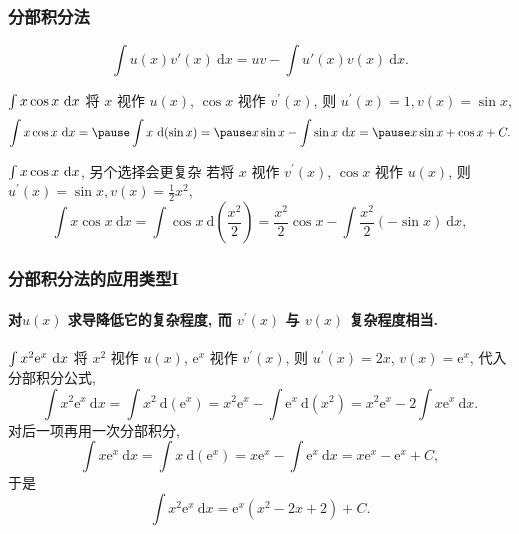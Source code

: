 \documentclass[
10pt,
aspectratio=43,
]{beamer}
\begin{document}
\begin{frame}
	\frametitle{分部积分法}
	\everymath{\displaystyle}
	\begin{block}{}
		$$
			\int u(x)v'(x)\mathrm{~d} x = uv - \int u'(x)v(x)\mathrm{~d} x.
		$$
	\end{block}
	\pause
	{\small
		\begin{exampleblock}{$\color{black}\int x \cos x \mathrm{~d} x$}
			将 $x$ 视作 $u(x)$, $\cos x$ 视作 $v^{\prime}(x)$, 则 $u^{\prime}(x)=1, v(x)=\sin x$,
			$$
				\int x \cos x \mathrm{~d} x  =\pause \int x \mathrm{~d}(\sin x)  =\pause x \sin x-\int \sin x \mathrm{~d} x=\pause x \sin x+\cos x+C.
			$$
		\end{exampleblock}
		\pause
		\begin{alertblock}{$\color{black}\int x \cos x \mathrm{~d} x$, {\color{black}另个选择会更复杂}}
			若将 $x$ 视作 $v^{\prime}(x)$, $\cos x$ 视作 $u(x)$, 则 $u^{\prime}(x)=\sin x, v(x)=\frac{1}{2}x^2$,
			$$
				\int x \cos x \mathrm{~d} x=\int \cos x \mathrm{~d}\left(\frac{x^2}{2}\right)=\frac{x^2}{2} \cos x-\int \frac{x^2}{2}(-\sin x) \mathrm{~d} x,
			$$
		\end{alertblock}
	}
\end{frame}

\begin{frame}
	\frametitle{分部积分法的应用类型I}
	\framesubtitle{对$u(x)$ 求导降低它的复杂程度, 而 $v^{\prime}(x)$ 与 $v(x)$ 复杂程度相当. }
	\everymath{\displaystyle}
	\begin{exampleblock}{$\color{black}\int x^2 \mathrm{e}^x \mathrm{~d} x$}
		\pause 将 $x^2$ 视作 $u(x)$, $\mathrm{e}^x$ 视作 $v^{\prime}(x)$, \pause 则 $u^{\prime}(x)=2 x$, $v(x)=\mathrm{e}^x$, 代入分部积分公式,
		$$
			\int x^2 \mathrm{e}^x \mathrm{~d} x=\int x^2 \mathrm{~d}\left(\mathrm{e}^x\right)=x^2 \mathrm{e}^x-\int \mathrm{e}^x \mathrm{~d}\left(x^2\right)=x^2 \mathrm{e}^x-2 \int x \mathrm{e}^x \mathrm{~d} x.
		$$
		\pause 对后一项再用一次分部积分,
		$$
			\int x \mathrm{e}^x \mathrm{~d} x=\int x \mathrm{~d}\left(\mathrm{e}^x\right)=x \mathrm{e}^x-\int \mathrm{e}^x \mathrm{~d} x=x \mathrm{e}^x-\mathrm{e}^x+C,
		$$
		\pause 于是
		$$
			\int x^2 \mathrm{e}^x \mathrm{~d} x=\mathrm{e}^x\left(x^2-2 x+2\right)+C.
		$$
	\end{exampleblock}
\end{frame}
\end{document}
